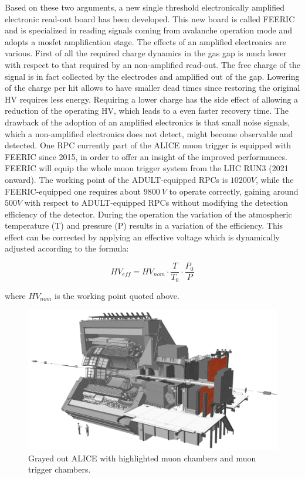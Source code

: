 Based on these two arguments, a new single threshold electronically amplified electronic read-out board has been developed.
This new board is called FEERIC and is specialized in reading signals coming from avalanche operation mode and adopts a mosfet amplification stage.
The effects of an amplified electronics are various.
First of all the required charge dynamics in the gas gap is much lower with respect to that required by an non-amplified read-out.
The free charge of the signal is in fact collected by the electrodes and amplified out of the gap.
Lowering of the charge per hit allows to have smaller dead times since restoring the original HV requires less energy.
Requiring a lower charge has the side effect of allowing a reduction of the operating HV, which leads to a even faster recovery time.
The drawback of the adoption of an amplified electronics is that small noise signals, which a non-amplified electronics does not detect, might become observable and detected.
One RPC currently part of the ALICE muon trigger is equipped with FEERIC since 2015, in order to offer an insight of the improved performances.
FEERIC will equip the whole muon trigger system from the LHC RUN3 (2021 onward).
The working point of the ADULT-equipped RPCs is $10200V$, while the FEERIC-equipped one requires about $9800\ V$ to operate correctly, gaining around $500V$ with respect to ADULT-equipped RPCs without modifying the detection efficiency of the detector.
During the operation the variation of the atmospheric temperature (T) and pressure (P) results in a variation of the efficiency.
This effect can be corrected by applying an effective voltage which is dynamically adjusted according to the formula:

\begin{equation}
\label{eq:HVcorrection}
HV_{eff} = HV_{nom}\cdot \frac{T}{T_0} \cdot \frac{P_0}{P}
\end{equation}

where $HV_{nom}$ is the working point quoted above.

\begin{figure}[!t]
\begin{center}
\includegraphics[width=\linewidth]{Chapters/Performance/Figs/ALICEmuon_MTR.pdf}
\caption{Grayed out ALICE with highlighted muon chambers and muon trigger chambers.}
\label{fig:ALICEmuon}
\end{center}
\end{figure}

